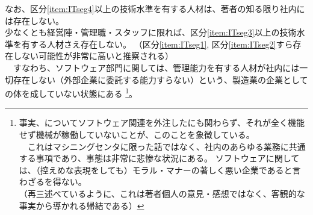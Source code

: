 \begin{hosoku}
なお、区分\ref{item:ITseg4}\hx 以上の技術水準を有する人材は、著者の知る限り社内には存在しない。\\
少なくとも経営陣・管理職・スタッフに限れば、区分\ref{item:ITseg3}\hx 以上の技術水準を有する人材さえ存在しない。
（区分\ref{item:ITseg1}, 区分\ref{item:ITseg2}\hx すら存在しない可能性が非常に高いと推察される）\\
　すなわち、ソフトウェア部門に関しては、管理能力を有する人材が社内には一切存在しない（外部企業に委託する能力すらない）という、製造業の企業としての体を成していない状態にある
\footnote{事実、\DMC についてソフトウェア関連を外注したにも関わらず、それが全く機能せず機械が稼働していないことが、このことを象徴している。\\
　これはマシニングセンタに限った話ではなく、社内のあらゆる業務に共通する事項であり、事態は非常に悲惨な状況にある。
ソフトウェアに関しては、（控えめな表現をしても）モラル・マナーの著しく悪い企業であると言わざるを得ない。\\
（再三述べているように、これは著者個人の意見・感想ではなく、客観的な事実から導かれる帰結である）}。
\end{hosoku}

